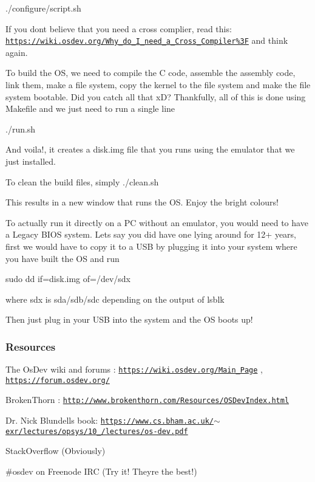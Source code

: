 {\ttfamily ./configure/script.sh}

If you don\textquotesingle{}t believe that you need a cross complier, read this\+: \href{https://wiki.osdev.org/Why_do_I_need_a_Cross_Compiler%3F}{\tt https\+://wiki.\+osdev.\+org/\+Why\+\_\+do\+\_\+\+I\+\_\+need\+\_\+a\+\_\+\+Cross\+\_\+\+Compiler\%3F} and think again.

To build the OS, we need to compile the C code, assemble the assembly code, link them, make a file system, copy the kernel to the file system and make the file system bootable. Did you catch all that xD? Thankfully, all of this is done using Makefile and we just need to run a single line

{\ttfamily ./run.sh}

And voila!, it creates a disk.\+img file that you runs using the emulator that we just installed.

To clean the build files, simply \textquotesingle{}./clean.sh\textquotesingle{}

This results in a new window that runs the OS. Enjoy the bright colours!

To actually run it directly on a PC without an emulator, you would need to have a Legacy B\+I\+OS system. Let\textquotesingle{}s say you did have one lying around for 12+ years, first we would have to copy it to a U\+SB by plugging it into your system where you have built the OS and run

{\ttfamily sudo dd if=disk.\+img of=/dev/sdx}

where {\ttfamily sdx} is {\ttfamily sda/sdb/sdc} depending on the output of {\ttfamily lsblk}

Then just plug in your U\+SB into the system and the OS boots up!

\subsubsection*{Resources}


\begin{DoxyItemize}
\item The Os\+Dev wiki and forums \+: \href{https://wiki.osdev.org/Main_Page}{\tt https\+://wiki.\+osdev.\+org/\+Main\+\_\+\+Page} , \href{https://forum.osdev.org/}{\tt https\+://forum.\+osdev.\+org/}
\item Broken\+Thorn \+: \href{http://www.brokenthorn.com/Resources/OSDevIndex.html}{\tt http\+://www.\+brokenthorn.\+com/\+Resources/\+O\+S\+Dev\+Index.\+html}
\item Dr. Nick Blundell\textquotesingle{}s book\+: \href{https://www.cs.bham.ac.uk/~exr/lectures/opsys/10_11/lectures/os-dev.pdf}{\tt https\+://www.\+cs.\+bham.\+ac.\+uk/$\sim$exr/lectures/opsys/10\+\_/lectures/os-\/dev.\+pdf}
\item Stack\+Overflow (Obviously)
\item \#osdev on Freenode I\+RC (Try it! They\textquotesingle{}re the best!) 
\end{DoxyItemize}